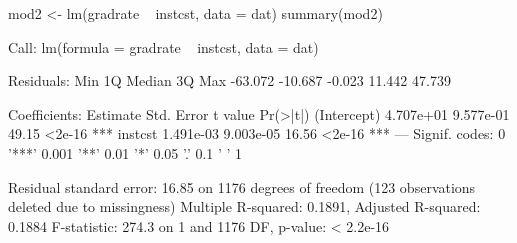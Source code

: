 \begin{Schunk}
\begin{Sinput}
 mod2 <- lm(gradrate ~ instcst, data = dat)
 summary(mod2)
\end{Sinput}
\begin{Soutput}
Call:
lm(formula = gradrate ~ instcst, data = dat)

Residuals:
    Min      1Q  Median      3Q     Max 
-63.072 -10.687  -0.023  11.442  47.739 

Coefficients:
             Estimate Std. Error t value Pr(>|t|)    
(Intercept) 4.707e+01  9.577e-01   49.15   <2e-16 ***
instcst     1.491e-03  9.003e-05   16.56   <2e-16 ***
---
Signif. codes:  0 '***' 0.001 '**' 0.01 '*' 0.05 '.' 0.1 ' ' 1

Residual standard error: 16.85 on 1176 degrees of freedom
  (123 observations deleted due to missingness)
Multiple R-squared:  0.1891,	Adjusted R-squared:  0.1884 
F-statistic: 274.3 on 1 and 1176 DF,  p-value: < 2.2e-16
\end{Soutput}
\end{Schunk}
